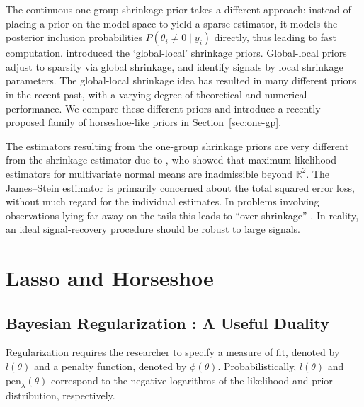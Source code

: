 \documentclass[11pt]{article}
\begin{document}
The continuous one-group shrinkage prior takes a different approach: instead of  placing a prior on the model space to yield a sparse estimator, it models the
posterior inclusion probabilities $P(\theta_i \ne 0 \mid y_i)$ directly, thus leading to fast computation.  \citet{carvalho2009handling,
polson2010shrink, carvalho2010horseshoe, polson2012half} introduced the `global-local' shrinkage priors. Global-local priors adjust to sparsity via
global shrinkage, and identify signals by local shrinkage parameters. The global-local shrinkage idea has resulted in many different priors in the recent
past, with a varying degree of theoretical and numerical performance. We compare these different priors and introduce a recently proposed family of
horseshoe-like priors in Section~\ref{sec:one-gp}.   

The estimators resulting from the one-group shrinkage priors are very different from the shrinkage estimator due to \citet{james_estimation_1961}, who showed
that maximum likelihood estimators for multivariate normal means are inadmissible beyond $\mathbb{R}^2$. The James--Stein estimator is primarily concerned about the total squared error loss, without much regard for the individual estimates. In problems involving observations lying far away on the tails this leads to ``over-shrinkage'' \citep{carvalho2010horseshoe}. In reality, an ideal signal-recovery procedure should be robust to large signals. 


\section{Lasso and Horseshoe}
\subsection{Bayesian Regularization : A Useful Duality}

Regularization requires the researcher to specify a measure of fit, denoted by $l(\theta)$ and a penalty function, denoted by $ \phi(\theta)$. Probabilistically,  $l(\theta)$ and $\text{pen}_{\lambda}(\theta)$ correspond to the negative logarithms of the likelihood and prior distribution, respectively.  
\end{document}
